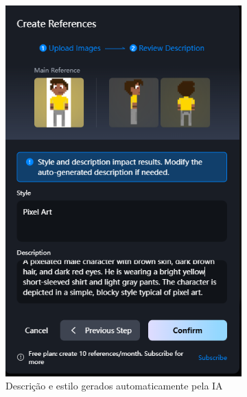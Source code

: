 \begin{figure}[htbp]
    \centering
    \caption{\small Tela da segunda etapa da criação de referência do personagem Pablo no Vidu}
    \label{fig:viduReferenciaPablo2}
    \begin{subfigure}{0.4\linewidth}
        \includegraphics[width=1\linewidth]{figs/vidu/tela_referencia_2.PNG}
        \caption{\small Descrição e estilo gerados automaticamente pela IA}
        \label{fig:viduReferenciaPablo2a}
    \end{subfigure}
    \begin{subfigure}{0.4\linewidth}

\end{subfigure}
\end{figure}
